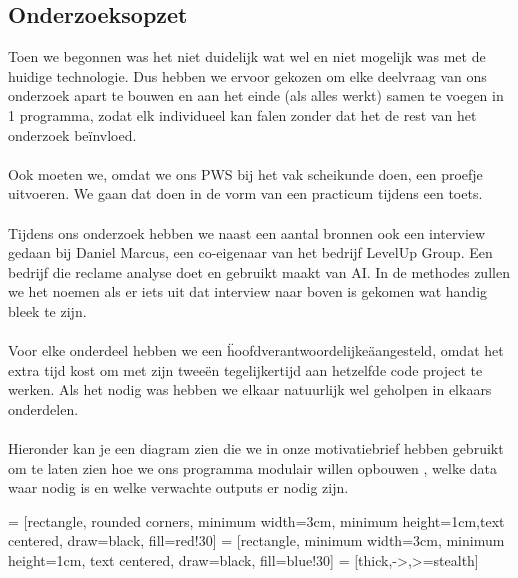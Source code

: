 \documentclass[12pt]{article}
\begin{document}
\subsection{Onderzoeksopzet}
\begin{multicols}{2}
Toen we begonnen was het niet duidelijk wat wel en niet mogelijk was met de huidige technologie. Dus hebben we ervoor gekozen om elke deelvraag van ons onderzoek apart te bouwen en aan het einde (als alles werkt) samen te voegen in 1 programma, zodat elk individueel kan falen zonder dat het de rest van het onderzoek beïnvloed.
\\\\
Ook moeten we, omdat we ons PWS bij het vak scheikunde doen, een proefje uitvoeren. We gaan dat doen in de vorm van een practicum tijdens een toets.
\\\\
Tijdens ons onderzoek hebben we naast een aantal bronnen ook een interview gedaan bij Daniel Marcus, een co-eigenaar van het bedrijf LevelUp Group. Een bedrijf die reclame analyse doet en gebruikt maakt van AI. In de methodes zullen we het noemen als er iets uit dat interview naar boven is gekomen wat handig bleek te zijn.
\\\\
Voor elke onderdeel hebben we een \"hoofdverantwoordelijke\" aangesteld, omdat het extra tijd kost om met zijn tweeën tegelijkertijd aan hetzelfde code project te werken. Als het nodig was hebben we elkaar natuurlijk wel geholpen in elkaars onderdelen. 
\\\\
Hieronder kan je een diagram zien die we in onze motivatiebrief hebben gebruikt om te laten zien hoe we ons programma modulair willen opbouwen , welke data waar nodig is en welke verwachte outputs er nodig zijn.
\end{multicols}

 = [rectangle, rounded corners, minimum width=3cm, minimum height=1cm,text centered, draw=black, fill=red!30]
 = [rectangle, minimum width=3cm, minimum height=1cm, text centered, draw=black, fill=blue!30]
 = [thick,->,>=stealth]
\end{document}
